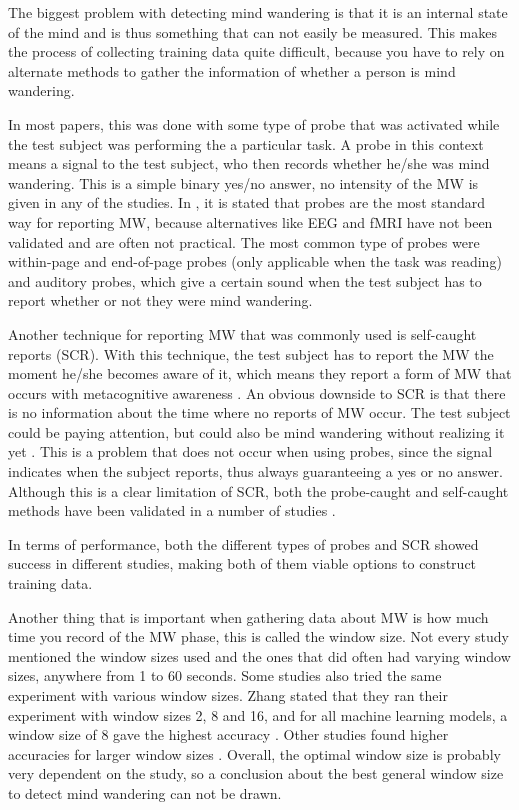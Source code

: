 The biggest problem with detecting mind wandering is that it is an internal state of the mind and is thus something that can not easily be measured. This makes the process of collecting training data quite difficult, because you have to rely on alternate methods to gather the information of whether a person is mind wandering.

In most papers, this was done with some type of probe that was activated while the test subject was performing the a particular task. A probe in this context means a signal to the test subject, who then records whether he/she was mind wandering. This is a simple binary yes/no answer, no intensity of the MW is given in any of the studies. In \cite{Bixler2015AutomaticPhysiology}, it is stated that probes are the most standard way for reporting MW, because alternatives like EEG and fMRI have not been validated and are often not practical. The most common type of probes were within-page and end-of-page probes (only applicable when the task was reading) and auditory probes, which give a certain sound when the test subject has to report whether or not they were mind wandering.

Another technique for reporting MW that was commonly used is self-caught reports (SCR). With this technique, the test subject has to report the MW the moment he/she becomes aware of it, which means they report a form of MW that occurs with metacognitive awareness \cite{Bixler2015AutomaticAwareness}. An obvious downside to SCR is that there is no information about the time where no reports of MW occur. The test subject could be paying attention, but could also be mind wandering without realizing it yet \cite{Bixler2015AutomaticAwareness}. This is a problem that does not occur when using probes, since the signal indicates when the subject reports, thus always guaranteeing a yes or no answer. Although this is a clear limitation of SCR, both the probe-caught and self-caught methods have been validated in a number of studies \cite{Bixler2015AutomaticPhysiology}. 

In terms of performance, both the different types of probes and SCR showed success in different studies, making both of them viable options to construct training data. 

Another thing that is important when gathering data about MW is how much time you record of the MW phase, this is called the window size. Not every study mentioned the window sizes used and the ones that did often had varying window sizes, anywhere from 1 to 60 seconds. Some studies also tried the same experiment with various window sizes. Zhang stated that they ran their experiment with window sizes 2, 8 and 16, and for all machine learning models, a window size of 8 gave the highest accuracy \cite{ISI:000443429900018}. Other studies found higher accuracies for larger window sizes \cite{Bixler2015AutomaticPhysiology}\cite{Bixler2015AutomaticAwareness}\cite{Stewart2017FaceComprehension}. Overall, the optimal window size is probably very dependent on the study, so a conclusion about the best general window size to detect mind wandering can not be drawn.